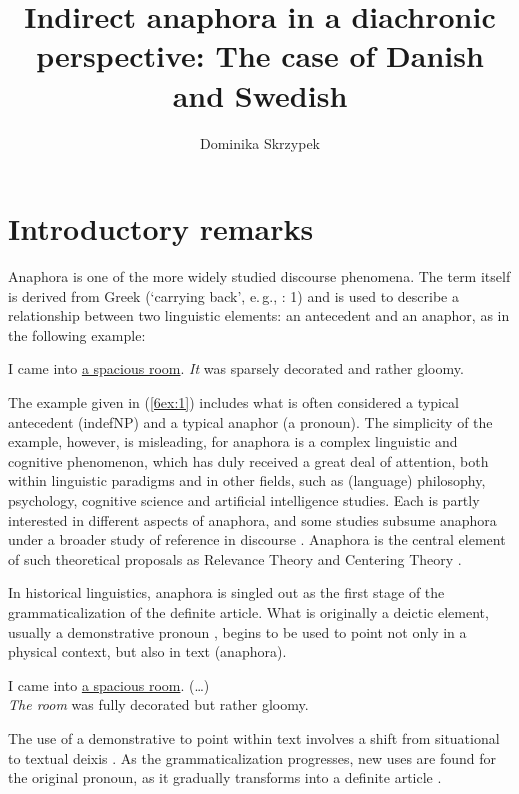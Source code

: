 \documentclass[output=paper]{langsci/langscibook}
\author{Dominika Skrzypek\affiliation{Adam Mickiewicz University, Poznań}}
\title{Indirect anaphora in a diachronic perspective: The case of Danish and Swedish}
\begin{document}
\maketitle

\section{Introductory remarks}\label{6sec:1}

Anaphora is one of the more widely studied discourse phenomena. The term itself is derived from Greek (`carrying back', e.\,g., \citealt{huang:00}: 1) and is used to describe a relationship between two linguistic elements: an antecedent and an anaphor, as in the following example:

\begin{exe}
\ex\label{6ex:1}
I came into {\ul{a spacious room}}. {\emph{It}} was sparsely decorated and rather gloomy.
\end{exe}

The example given in (\ref{6ex:1}) includes what is often considered a typical antecedent (indefNP) and a typical anaphor (a pronoun). The simplicity of the example, however, is misleading, for anaphora is a complex linguistic and cognitive phenomenon, which has duly received a great deal of attention, both within linguistic paradigms and in other fields, such as (language) philosophy, psychology, cognitive science and artificial intelligence studies. Each is partly interested in different aspects of anaphora, and some studies subsume anaphora under a broader study of reference in discourse \citep[e.\,g.,][]{kibrik:11}. Anaphora is the central element of such theoretical proposals as Relevance Theory \citep{sperber:wilson:12} and Centering Theory \citep{grosz:etal:95}. 

In historical linguistics, anaphora is singled out as the first stage of the grammaticalization of the definite article. What is originally a deictic element, usually a demonstrative pronoun \citep[see][]{lyons:99}, begins to be used to point not only in a physical context, but also in text (anaphora). 

\begin{exe}
\ex\label{6ex:2}
I came into {\ul{a spacious room}}. (\ldots) \\
{\emph{The room}} was fully decorated but rather gloomy.
\end{exe}

The use of a demonstrative to point within text involves a shift from situational to textual deixis \citep{lyons:75}. As the grammaticalization progresses, new uses are found for the original pronoun, as it gradually transforms into a definite article \citep{mulder:carlier:11}. 
\end{document}
